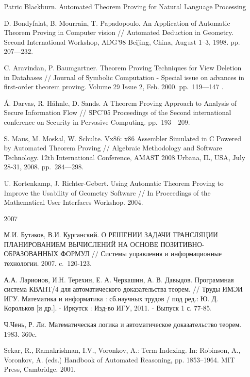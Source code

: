 \begin{thebibliography}{99}

 Patric Blackburn. Automated Theorem Proving for Natural Language Processing

 D. Bondyfalat, B. Mourrain, T. Papadopoulo. An Application of Automatic Theorem Proving in Computer vision // Automated Deduction in Geometry. Second International Workshop, ADG’98 Beijing, China, August 1–3, 1998. pp. 207---232.

 C. Aravindan, P. Baumgartner. Theorem Proving Techniques for View Deletion in Databases // Journal of Symbolic Computation - Special issue on advances in first-order theorem proving. Volume 29 Issue 2, Feb. 2000. pp.~119---147 .

 	Á. Darvas, R. Hähnle, D. Sands. A Theorem Proving Approach to Analysis of Secure Information Flow // SPC'05 Proceedings of the Second international conference on Security in Pervasive Computing. pp.~193---209.

 S. Maus, M. Moskal, W. Schulte. Vx86: x86 Assembler Simulated in C Powered by Automated Theorem Proving // Algebraic Methodology and Software Technology. 12th International Conference, AMAST 2008 Urbana, IL, USA, July 28-31, 2008. pp.~284---298.

 U. Kortenkamp, J. Richter-Gebert. Using Automatic Theorem Proving to Improve the Usability of Geometry Software // In Proceedings of the Mathematical User Interfaces Workshop. 2004. 

 2007


 М.И. Бутаков, В.И. Курганский. О РЕШЕНИИ ЗАДАЧИ ТРАНСЛЯЦИИ ПЛАНИРОВАНИЕМ ВЫЧИСЛЕНИЙ НА ОСНОВЕ ПОЗИТИВНО-ОБРАЗОВАННЫХ ФОРМУЛ // Системы управления и информационные технологии. 2007. c.~120-123.

 А.А. Ларионов, И.Н. Терехин, Е. А. Черкашин, А. В. Давыдов.
Программная система КВАНТ/4 для автоматического доказательства теорем.
// Труды ИМЭИ ИГУ. Математика и информатика : сб.научных трудов / под
ред.: Ю. Д. Корольков [и др.]. - Иркутск : Изд-во ИГУ, 2011. - Выпуск
1 с. 77-85.

 Ч.Чень, Р. Ли. Математическая логика и автоматическое доказательство теорем. 1983. 360c.

 Sekar, R., Ramakrishnan, I.V., Voronkov, A.: Term Indexing. In: Robinson, A., Voronkov, A. (eds.) Handbook of Automated Reasoning, pp. 1853--1964. MIT Press, Cambridge. 2001.


\end{thebibliography}
